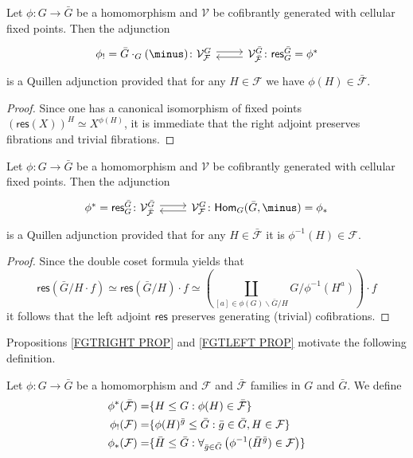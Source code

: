 \documentclass[a4paper,10pt]{article}%
\begin{document}
\begin{proposition}\label{FGTRIGHT PROP}
	Let $\phi \colon G \to \bar{G}$ be a homomorphism and $\mathcal{V}$ be cofibrantly generated with cellular fixed points.	
	Then the adjunction
\[
\begin{tikzcd}
	\phi_{!} = \bar{G} \cdot_G(\minus)
	\colon
	\mathcal{V}^{G}_{\mathcal{F}} \ar[shift left=1]{r}
&
	\mathcal{V}^{\bar{G}}_{\bar{\mathcal{F}}}
	\colon \ar[shift left=1]{l}
	\mathsf{res}^{\bar{G}}_G = \phi^{\**}
\end{tikzcd}
\]
is a Quillen adjunction provided that for any 
$H \in \mathcal{F}$ we have $\phi(H) \in \bar{\mathcal{F}}$.
\end{proposition}

\begin{proof}
Since one has a canonical isomorphism of fixed points
$\left(\mathsf{res}(X)\right)^H \simeq X^{\phi(H)}$,
it is immediate that the right adjoint preserves fibrations and trivial fibrations.
\end{proof}


\begin{proposition}\label{FGTLEFT PROP}
	Let $\phi \colon G \to \bar{G}$ be a homomorphism and $\mathcal{V}$ be cofibrantly generated with cellular fixed points.		
	Then the adjunction
\[
\begin{tikzcd}
	\phi^{\**} = \mathsf{res}^{\bar{G}}_G
	\colon
	\mathcal{V}^{\bar{G}}_{\mathcal{\bar{F}}} \ar[shift left=1]{r}
&
	\mathcal{V}^{G}_{\mathcal{F}}
	\colon \ar[shift left=1]{l}
	\mathsf{Hom}_G(\bar{G},\minus) = \phi_{\**}
\end{tikzcd}
\]
is a Quillen adjunction provided that for any 
$H \in \bar{\mathcal{F}}$ it is 
$\phi^{-1}(H) \in \mathcal{F}$.
\end{proposition}


\begin{proof}
	Since the double coset formula yields that
\[
	\mathsf{res}\left(\bar{G}/H \cdot f\right)
		\simeq 
	\mathsf{res}\left(\bar{G}/H\right) \cdot f
		\simeq
	\left(
		\coprod_{[a] \in \phi(G)\backslash \bar{G} /H}
		{G/\phi^{-1}(H^{a})}
	\right)	\cdot f
\]
it follows that the left adjoint $\mathsf{res}$ preserves generating (trivial) cofibrations.
\end{proof}


Propositions \ref{FGTRIGHT PROP} and \ref{FGTLEFT PROP}
motivate the following definition.

\begin{definition}
	Let $\phi \colon G \to \bar{G}$ be a homomorphism and $\mathcal{F}$ and $\bar{\mathcal{F}}$ families in $G$
	and $\bar{G}$. We define
\begin{align}\label{PHISTARDEF EQ}
	\phi^{\**}(\bar{\mathcal{F}})
		=&
	\{H \leq G : \phi(H) \in \bar{\mathcal{F}}\}
\\
	\phi_!(\mathcal{F})
		=&
	\{\phi(H)^{\bar{g}}\leq \bar{G} : \bar{g} \in \bar{G}, H \in \mathcal{F}\}
\\ \label{PHISTARDEF3 EQ}
	\phi_{\**}(\mathcal{F})
		=&
	\{\bar{H} \leq \bar{G} : 
	\forall_{\bar{g} \in \bar{G}} 
	\left(
	\phi^{-1}(\bar{H}^{\bar{g}}) \in \mathcal{F}
	\right)\}
\end{align}
\end{definition}
\end{document}
